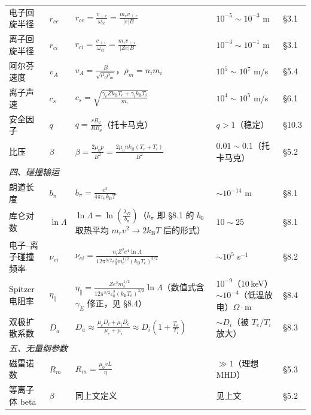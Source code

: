\documentclass[12pt,a4paper,openany,oneside]{book}
\newcommand{\eps}{\varepsilon}
\begin{document}
{\begin{longtable}{@{}p{2.2cm}p{1.2cm}p{7.1cm}p{2.9cm}p{1.4cm}@{}}
电子回旋半径 & $r_{ce}$ & $\displaystyle r_{ce} = \frac{v_{\perp e}}{\omega_{ce}} = \frac{m_e v_{\perp e}}{|e|B}$ & $10^{-5}\sim10^{-3}$ m & \S 3.1 \\
离子回旋半径 & $r_{ci}$ & $\displaystyle r_{ci} = \frac{v_{\perp i}}{\omega_{ci}} = \frac{m_i v_{\perp i}}{|Ze|B}$ & $10^{-3}\sim10^{-1}$ m & \S 3.1 \\
阿尔芬速度 & $v_A$ & $\displaystyle v_A = \frac{B}{\sqrt{\mu_0\rho_m}}$，$\rho_m=n_i m_i$ & $10^{5}\sim10^{7}$ m/s & \S 5.4 \\
离子声速 & $c_s$ & $\displaystyle c_s = \sqrt{\frac{\gamma_e Z k_\mathrm{B}T_e + \gamma_i k_\mathrm{B}T_i}{m_i}}$ & $10^{4}\sim10^{5}$ m/s & \S 6.1 \\
安全因子 & $q$ & $\displaystyle q = \frac{r B_\varphi}{R B_\theta}$（托卡马克）& $q>1$（稳定）& \S 10.3 \\
比压 & $\beta$ & $\displaystyle\beta = \frac{2\mu_0 p}{B^2} = \frac{2\mu_0 n k_\mathrm{B}(T_e+T_i)}{B^2}$ & $0.01\sim0.1$（托卡马克）& \S 5.2 \\
\midrule
\multicolumn{5}{l}{\textit{四、碰撞输运}} \\
\midrule
朗道长度 & $b_\pi$ & $\displaystyle b_\pi = \frac{e^2}{4\pi\eps_0 k_\mathrm{B}T}$ & $\sim 10^{-14}$ m & \S 8.1 \\
库仑对数 & $\ln\Lambda$ & $\displaystyle\ln\Lambda = \ln\!\left(\frac{\lambda_D}{b_\pi}\right)$（$b_\pi$ 即 \S 8.1 的 $b_0$ 取热平均 $m_rv^2\to2k_\mathrm{B}T$ 后的形式） & $10\sim 25$ & \S 8.1 \\
电子--离子碰撞频率 & $\nu_{ei}$ & $\displaystyle\nu_{ei} = \frac{n_i Z^2 e^4\ln\Lambda}{12\pi^{3/2}\eps_0^2 m_e^{1/2}(k_\mathrm{B}T_e)^{3/2}}$ & $\sim 10^{5}$ s$^{-1}$ & \S 8.2 \\
Spitzer 电阻率 & $\eta_\parallel$ & $\displaystyle\eta_\parallel = \frac{Z e^2 m_e^{1/2}}{12\pi^{3/2}\eps_0^2(k_\mathrm{B}T_e)^{3/2}}\ln\Lambda$（数值式含 $\gamma_E$ 修正，见 \S 8.4） & $10^{-9}$（10\,keV）$\sim 10^{-4}$（低温放电）$\Omega\cdot$m & \S 8.4 \\
双极扩散系数 & $D_a$ & $\displaystyle D_a \approx \frac{\mu_e D_i + \mu_i D_e}{\mu_e + \mu_i}\approx D_i\left(1+\frac{T_e}{T_i}\right)$ & $\sim D_i$（被 $T_e/T_i$ 放大）& \S 8.3 \\
\midrule
\multicolumn{5}{l}{\textit{五、无量纲参数}} \\
\midrule
磁雷诺数 & $R_m$ & $\displaystyle R_m = \frac{\mu_0 v L}{\eta}$ & $\gg 1$（理想 MHD）& \S 5.3 \\
等离子体 beta & $\beta$ & 同上文定义 & 见上文 & \S 5.2 \\
\end{longtable}
}
\end{document}
